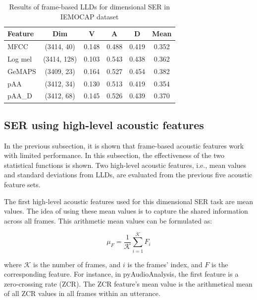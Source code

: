\begin{table}
    \caption{Results of frame-based LLDs for dimensional SER in IEMOCAP dataset}
    \begin{center}
    \begin{tabular}{l | c | c c c c}
      \hline 
Feature & Dim & V & A & D & Mean \\
\hline \hline
MFCC      & (3414, 40)    &0.148    & 0.488   & 0.419   & 0.352 \\
Log mel   & (3414, 128)   &0.103    & 0.543   & 0.438   & 0.362 \\
GeMAPS    & (3409, 23)    &0.164    & 0.527   & 0.454   & 0.382 \\
pAA       & (3412, 34)    &0.130    & 0.513   & 0.419   & 0.354 \\
pAA\_D    & (3412, 68)    &0.145    & 0.526   & 0.439   & 0.370 \\
      \hline
    \end{tabular}
    \label{tab:iemocap-lld}
  \end{center}
\end{table}




\subsection{SER using high-level acoustic features}
In the previous subsection, it is shown that frame-based acoustic features work
with limited performance. In this subsection, the effectiveness of the two
statistical functions is shown. Two high-level acoustic features, i.e., mean
values and standard deviations from LLDs, are evaluated from the previous five
acoustic feature sets. 

The first high-level acoustic features used for this dimensional SER task are
mean values. The idea of using these mean values is to capture the shared
information across all frames. This arithmetic mean values can be formulated
as: 

\begin{equation}
  \mu_F = \frac{1}{\mathcal{K}}\sum _{i=1}^\mathcal{K} F_i  
\end{equation}

\noindent where $\mathcal{K}$ is the number of frames,  and $i$ is the frames'
index, and $F$ is the corresponding feature.  For instance, in pyAudioAnalysis,
the first feature is a zero-crossing rate (ZCR).  The ZCR feature's mean value
is the arithmetical mean of all ZCR values in all frames within an utterance.  


